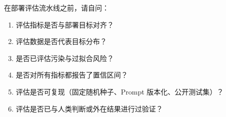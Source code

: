\begin{questionbox}[评估设计的关键问题]
在部署评估流水线之前，请自问：

\begin{enumerate}
  \item 评估指标是否与部署目标对齐？
  \item 评估数据是否代表目标分布？
  \item 是否已评估污染与过拟合风险？
  \item 是否对所有指标都报告了置信区间？
  \item 评估是否可复现（固定随机种子、Prompt 版本化、公开测试集）？
  \item 评估是否已与人类判断或外在结果进行过验证？
\end{enumerate}
\end{questionbox}
